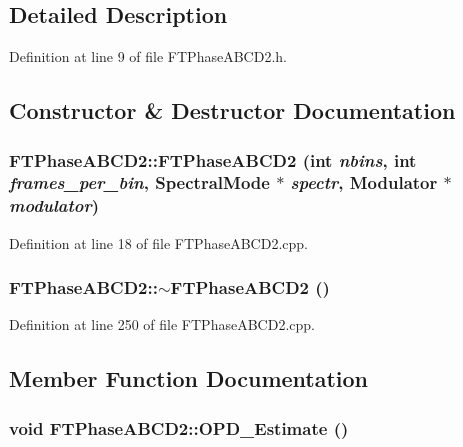 \subsection{Detailed Description}


Definition at line 9 of file FTPhaseABCD2.h.



\subsection{Constructor \& Destructor Documentation}
\hypertarget{classFTPhaseABCD2_ad221cbcea6aae7dc1ee5b781c17bba81}{
\subsubsection[{FTPhaseABCD2}]{\setlength{\rightskip}{0pt plus 5cm}FTPhaseABCD2::FTPhaseABCD2 (int {\em nbins}, \/  int {\em frames\_\-per\_\-bin}, \/  {\bf SpectralMode} $\ast$ {\em spectr}, \/  {\bf Modulator} $\ast$ {\em modulator})}}
\label{classFTPhaseABCD2_ad221cbcea6aae7dc1ee5b781c17bba81}


Definition at line 18 of file FTPhaseABCD2.cpp.

\hypertarget{classFTPhaseABCD2_aa873d8d953ee9ae65b02962ee59c3705}{
\subsubsection[{$\sim$FTPhaseABCD2}]{\setlength{\rightskip}{0pt plus 5cm}FTPhaseABCD2::$\sim$FTPhaseABCD2 ()}}
\label{classFTPhaseABCD2_aa873d8d953ee9ae65b02962ee59c3705}


Definition at line 250 of file FTPhaseABCD2.cpp.



\subsection{Member Function Documentation}
\hypertarget{classFTPhaseABCD2_a1f9794309bdfae8ea7c5f57682b89dbf}{
\subsubsection[{OPD\_\-Estimate}]{\setlength{\rightskip}{0pt plus 5cm}void FTPhaseABCD2::OPD\_\-Estimate ()}}
\label{classFTPhaseABCD2_a1f9794309bdfae8ea7c5f57682b89dbf}


